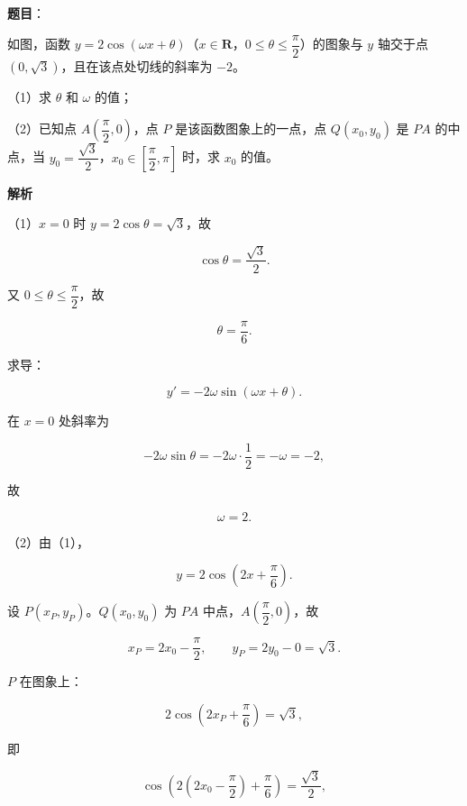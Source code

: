 \begin{answer}

\textbf{题目}：

如图，函数 $y=2\cos(\omega x+\theta)$（$x\in\mathbf R$，$0\leqslant\theta\leqslant\dfrac{\pi}{2}$）的图象与 $y$ 轴交于点 $(0,\sqrt3)$，且在该点处切线的斜率为 $-2$。

（1）求 $\theta$ 和 $\omega$ 的值；

（2）已知点 $A\left(\dfrac{\pi}{2},0\right)$，点 $P$ 是该函数图象上的一点，点 $Q(x_0,y_0)$ 是 $PA$ 的中点，当 $y_0=\dfrac{\sqrt3}{2}$，$x_0\in\left[\dfrac{\pi}{2},\pi\right]$ 时，求 $x_0$ 的值。
\nopagebreak[4]
\begin{center}\end{center}
\nopagebreak[4]
\textbf{解析}

（1）$x=0$ 时 $y=2\cos\theta=\sqrt3$，故

\nopagebreak[4]
\[\cos\theta=\frac{\sqrt3}{2}.\]

又 $0\leqslant\theta\leqslant\dfrac{\pi}{2}$，故

\nopagebreak[4]
\[\theta=\frac{\pi}{6}.\]

求导：

\nopagebreak[4]
\[y'=-2\omega\sin(\omega x+\theta).\]

在 $x=0$ 处斜率为

\nopagebreak[4]
\[-2\omega\sin\theta=-2\omega\cdot\frac12=-\omega=-2,\]

故

\nopagebreak[4]
\[\omega=2.\]

（2）由（1），

\nopagebreak[4]
\[y=2\cos\left(2x+\frac{\pi}{6}\right).\]

设 $P(x_P,y_P)$。$Q(x_0,y_0)$ 为 $PA$ 中点，$A\left(\dfrac{\pi}{2},0\right)$，故

\nopagebreak[4]
\[x_P=2x_0-\frac{\pi}{2},\qquad y_P=2y_0-0=\sqrt3.\]

$P$ 在图象上：

\nopagebreak[4]
\[2\cos\left(2x_P+\frac{\pi}{6}\right)=\sqrt3,\]

即

\nopagebreak[4]
\[\cos\left(2\left(2x_0-\frac{\pi}{2}\right)+\frac{\pi}{6}\right)=\frac{\sqrt3}{2},\]


\end{answer}

